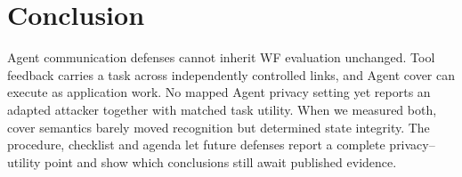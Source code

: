 \section{Conclusion}
Agent communication defenses cannot inherit WF evaluation unchanged. Tool feedback carries a task across independently controlled links, and Agent cover can execute as application work. No mapped Agent privacy setting yet reports an adapted attacker together with matched task utility. When we measured both, cover semantics barely moved recognition but determined state integrity. The procedure, checklist and agenda let future defenses report a complete privacy--utility point and show which conclusions still await published evidence.
